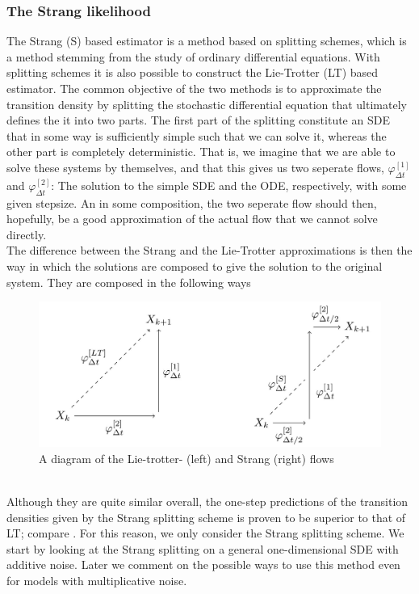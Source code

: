 \subsubsection{The Strang likelihood}
The Strang (S) based estimator is a method based on splitting schemes, which is a method stemming from the study of ordinary differential equations. With splitting schemes it is also possible to construct the Lie-Trotter (LT) based estimator. The common objective of the two methods is to approximate the transition density by splitting the stochastic differential equation that ultimately defines the it into two parts. The first part of the splitting constitute an SDE that in some way is sufficiently simple such that we can solve it, whereas the other part is completely deterministic. That is, we imagine that we are able to solve these systems by themselves, and that this gives us two seperate flows, $\varphi_{\Delta t}^{[1]}$ and $\varphi_{\Delta t}^{[2]}$: The solution to the simple SDE and the ODE, respectively, with some given stepsize. An in some composition, the two seperate flow should then, hopefully, be a good approximation of the actual flow that we cannot solve directly.\\ The difference between the Strang and the Lie-Trotter approximations is then the way in which the solutions are composed to give the solution to the original system. They are composed in the following ways
\begin{figure}[h!]
    \begin{center}
    \includegraphics[scale = .2]{figures/strangAndLieTrotter.jpeg}
    \end{center}
    \caption{A diagram of the Lie-trotter- (left) and Strang (right) flows}
    \label{figure:StrangAndLieTrotterPlot}
\end{figure}\\
Although they are quite similar overall, the one-step predictions of the transition densities given by the Strang splitting scheme is proven to be superior to that of LT; compare \cite[Proposition 3.4 and 3.6]{SplittingSchemes}. For this reason, we only consider the Strang splitting scheme. We start by looking at the Strang splitting on a general one-dimensional SDE with additive noise. Later we comment on the possible ways to use this method even for models with multiplicative noise.\\

